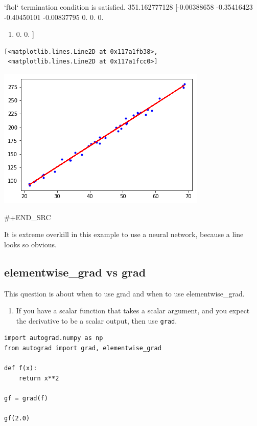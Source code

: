 \documentclass[11pt]{article}
\begin{document}
`ftol` termination condition is satisfied. 351.162777128 [-0.00388658 -0.35416423 -0.40450101 -0.00837795  0.          0.          0.
\begin{enumerate}
\item 0.          0.        ]
\end{enumerate}

\begin{verbatim}
[<matplotlib.lines.Line2D at 0x117a1fb38>,
 <matplotlib.lines.Line2D at 0x117a1fcc0>]
\end{verbatim}



\begin{center}
\includegraphics[width=.9\linewidth]{obipy-resources/a10feaf5270288b4c795ebce6b64fde6-70304IE1.png}
\end{center}

\#+END\_SRC

It is extreme overkill in this example to use a neural network, because a line looks so obvious.

\subsection{elementwise\_grad vs grad}
\label{sec:org8efcb4b}

This question is about when to use grad and when to use elementwise\_grad.

\begin{enumerate}
\item If you have a scalar function that takes a scalar argument, and you expect the derivative to be a scalar output, then use \texttt{grad}.
\end{enumerate}

\begin{verbatim}
import autograd.numpy as np
from autograd import grad, elementwise_grad

def f(x):
    return x**2

gf = grad(f)

gf(2.0)
\end{verbatim}
\end{document}
